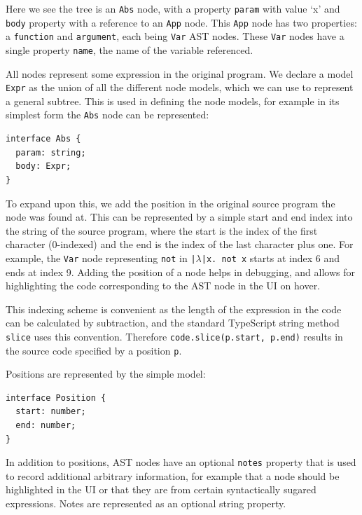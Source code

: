 \documentclass[a4paper,fleqn,oneside,12pt]{report}
\begin{document}
Here we see the tree is an \texttt{Abs} node, with a property \texttt{param} with value `x' and \texttt{body} property with a reference to an \texttt{App} node. This \texttt{App} node has two properties: a \texttt{function} and \texttt{argument}, each being \texttt{Var} AST nodes. These \texttt{Var} nodes have a single property \texttt{name}, the name of the variable referenced.

All nodes represent some expression in the original program. We declare a model \texttt{Expr} as the union of all the different node models, which we can use to represent a general subtree. This is used in defining the node models, for example in its simplest form the \texttt{Abs} node can be represented:

\begin{verbatim}
interface Abs {
  param: string;
  body: Expr;
}
\end{verbatim}
To expand upon this, we add the position in the original source program the node was found at. This can be represented by a simple start and end index into the string of the source program, where the start is the index of the first character (0-indexed) and the end is the index of the last character plus one. For example, the \texttt{Var} node representing \texttt{not} in \texttt{|$\lambda$|x. not x} starts at index 6 and ends at index 9. Adding the position of a node helps in debugging, and allows for highlighting the code corresponding to the AST node in the UI on hover.

This indexing scheme is convenient as the length of the expression in the code can be calculated by subtraction, and the standard TypeScript string method \texttt{slice} uses this convention. Therefore \texttt{code.slice(p.start, p.end)} results in the source code specified by a position \texttt{p}.

Positions are represented by the simple model:

\begin{verbatim}
interface Position {
  start: number;
  end: number;
}
\end{verbatim}
In addition to positions, AST nodes have an optional \texttt{notes} property that is used to record additional arbitrary information, for example that a node should be highlighted in the UI or that they are from certain syntactically sugared expressions. Notes are represented as an optional string property.
\end{document}

